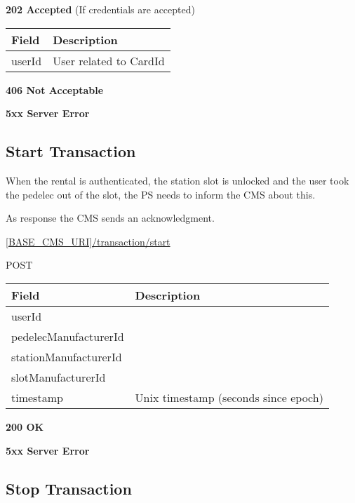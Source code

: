\textbf{202 Accepted} (If credentials are accepted)

\begin{tabularx}{\linewidth}{ | l | X | }
  \hline
  \rowcolor{table-head}
  Field & Description \\
  \hline
  userId						& User related to CardId \\
    \hline
\end{tabularx}

 \textbf{406 Not Acceptable}

\textbf{5xx Server Error}

\subsection{Start Transaction}

When the rental is authenticated, the station slot is unlocked and the user took the pedelec out of the slot, the \acs{PS} needs to inform the \acs{CMS} about this.

As response the \acs{CMS} sends an acknowledgment.

 \url{[BASE_CMS_URI]/transaction/start}

 POST

\newpage
{} 
\begin{table}[!h]
\vspace{-7mm}
\begin{tabularx}{\linewidth}{ | l | X | }
  \hline
  \rowcolor{table-head}
  Field & Description \\
  \hline
  	userId 		& \\
  	pedelecManufacturerId			& \\
  	stationManufacturerId			& \\
  	slotManufacturerId			& \\
  	timestamp					& Unix timestamp (seconds since epoch) \\
    \hline
\end{tabularx}
\end{table}

 \textbf{200 OK}

 \textbf{5xx Server Error}

\subsection{Stop Transaction}

